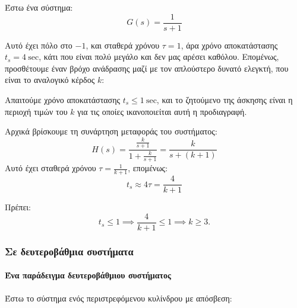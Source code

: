 \documentclass[11pt,a4paper,notitlepage,fleqn,final]{article}
\begin{document}
\begin{exercise}
Έστω ένα σύστημα:
\[
G(s) = \frac{1}{s+1}
\]

Αυτό έχει πόλο στο \( -1 \), και σταθερά χρόνου \( τ = 1 \), άρα χρόνο αποκατάστασης \( t_s = 4\ \mathrm{sec} \),
κάτι που είναι πολύ μεγάλο και δεν μας αρέσει καθόλου. Επομένως, προσθέτουμε έναν βρόχο ανάδρασης μαζί με τον
απλούστερο δυνατό ελεγκτή, που είναι το αναλογικό κέρδος \( \boxed{k} \):


Απαιτούμε χρόνο αποκατάστασης \( t_s \leq 1\ \mathrm{sec} \), και το ζητούμενο της άσκησης είναι η περιοχή τιμών
του \( k \) για τις οποίες ικανοποιείται αυτή η προδιαγραφή.

\tcblower
Αρχικά βρίσκουμε τη συνάρτηση μεταφοράς του συστήματος:
\[
H(s) = \frac{\frac{k}{s+1}}{1+\frac{k}{s+1}}
= \frac{k}{s+(k+1)}
\]
Αυτό έχει σταθερά χρόνου \( τ = \frac{1}{k+1} \), επομένως:
\[
t_s \approx 4τ = \frac{4}{k+1}
\]

Πρέπει:
\[
t_s \leq 1 \implies \frac{4}{k+1} \leq 1 \implies k \geq 3.
\]

\end{exercise}

\subsubsection{Σε δευτεροβάθμια συστήματα}

\paragraph{Ένα παράδειγμα δευτεροβάθμιου συστήματος}
Έστω το σύστημα ενός περιστρεφόμενου κυλίνδρου με απόσβεση:
\end{document}
